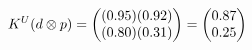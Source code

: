 \documentclass[preview]{standalone}
\begin{document}
\begin{align*}
\special{dvisvgm:raw <g id='unique000'>}K^U(d \otimes p) = \begin{pmatrix} (0.95)(0.92) \\ (0.80)(0.31) \end{pmatrix} = \begin{pmatrix} 0.87 \\ 0.25 \end{pmatrix}\special{dvisvgm:raw </g>}
\end{align*}
\end{document}
